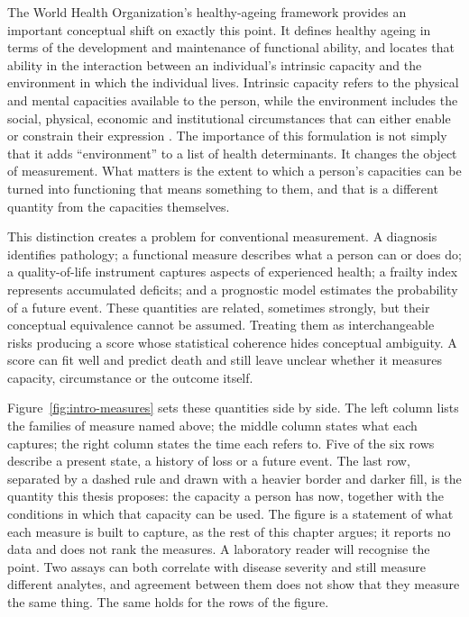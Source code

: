 The World Health Organization's healthy-ageing framework provides an important conceptual shift on exactly this point. It defines healthy ageing in terms of the development and maintenance of functional ability, and locates that ability in the interaction between an individual's intrinsic capacity and the environment in which the individual lives. Intrinsic capacity refers to the physical and mental capacities available to the person, while the environment includes the social, physical, economic and institutional circumstances that can either enable or constrain their expression \citep{who_2015_ageing,beard_intrinsic_2019}. The importance of this formulation is not simply that it adds ``environment'' to a list of health determinants. It changes the object of measurement. What matters is the extent to which a person's capacities can be turned into functioning that means something to them, and that is a different quantity from the capacities themselves.

This distinction creates a problem for conventional measurement. A diagnosis identifies pathology; a functional measure describes what a person can or does do; a quality-of-life instrument captures aspects of experienced health; a frailty index represents accumulated deficits; and a prognostic model estimates the probability of a future event. These quantities are related, sometimes strongly, but their conceptual equivalence cannot be assumed. Treating them as interchangeable risks producing a score whose statistical coherence hides conceptual ambiguity. A score can fit well and predict death and still leave unclear whether it measures capacity, circumstance or the outcome itself.

Figure~\ref{fig:intro-measures} sets these quantities side by side. The left column lists the families of measure named above; the middle column states what each captures; the right column states the time each refers to. Five of the six rows describe a present state, a history of loss or a future event. The last row, separated by a dashed rule and drawn with a heavier border and darker fill, is the quantity this thesis proposes: the capacity a person has now, together with the conditions in which that capacity can be used. The figure is a statement of what each measure is built to capture, as the rest of this chapter argues; it reports no data and does not rank the measures. A laboratory reader will recognise the point. Two assays can both correlate with disease severity and still measure different analytes, and agreement between them does not show that they measure the same thing. The same holds for the rows of the figure.

